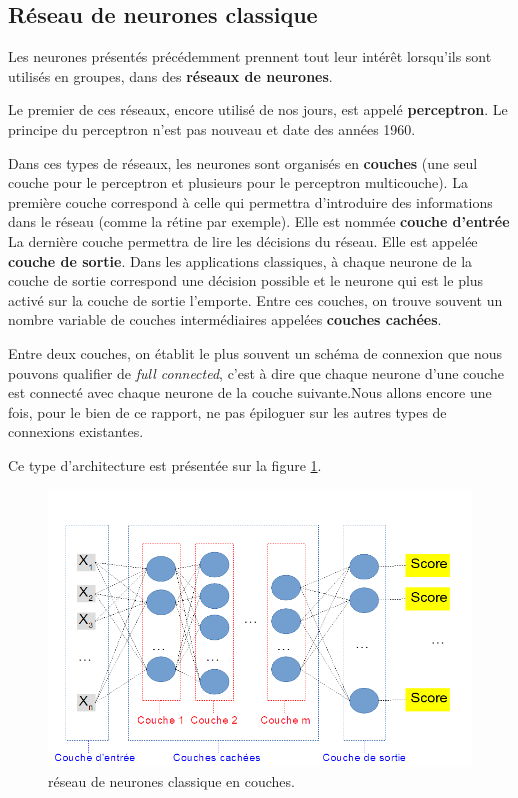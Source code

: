 \hypertarget{Ruxe9seau-de-neurones-classique}{%
\subsection{Réseau de neurones classique}
\label{Ruxe9seau-de-neurones-classique}}

Les neurones présentés précédemment prennent tout leur intérêt lorsqu'ils sont utilisés en groupes, dans des \textbf{réseaux de neurones}.

Le premier de ces réseaux, encore utilisé de nos jours, est appelé \textbf{perceptron}.
Le principe du perceptron n'est pas nouveau et date des années 1960.

Dans ces types de réseaux, les neurones sont organisés en \textbf{couches} (une seul couche pour le perceptron et plusieurs pour le perceptron multicouche).
La première couche correspond à celle qui permettra d'introduire des informations dans le réseau (comme la rétine par exemple). Elle est nommée \textbf{couche d'entrée}
La dernière couche permettra de lire les décisions du réseau. Elle est appelée \textbf{couche de sortie}. Dans les applications classiques, à chaque neurone de la couche de sortie correspond une décision possible et le neurone qui est le plus activé sur la couche de sortie l'emporte.
Entre ces couches, on trouve souvent un nombre variable de couches intermédiaires appelées \textbf{couches cachées}.

Entre deux couches, on établit le plus souvent un schéma de connexion que nous pouvons qualifier de \textit{full connected}, c'est à dire que chaque neurone d'une couche est connecté avec chaque neurone de la couche suivante.Nous allons encore une fois, pour le bien de ce rapport, ne pas épiloguer sur les autres types de connexions existantes.\newline

Ce type d'architecture est présentée sur la figure \ref{reseauClassique}.

\begin{figure}[h]
\includegraphics[width=16.5cm]{./images/multicouche.png}
\caption{réseau de neurones classique en couches.%
\label{reseauClassique}}
\end{figure}



